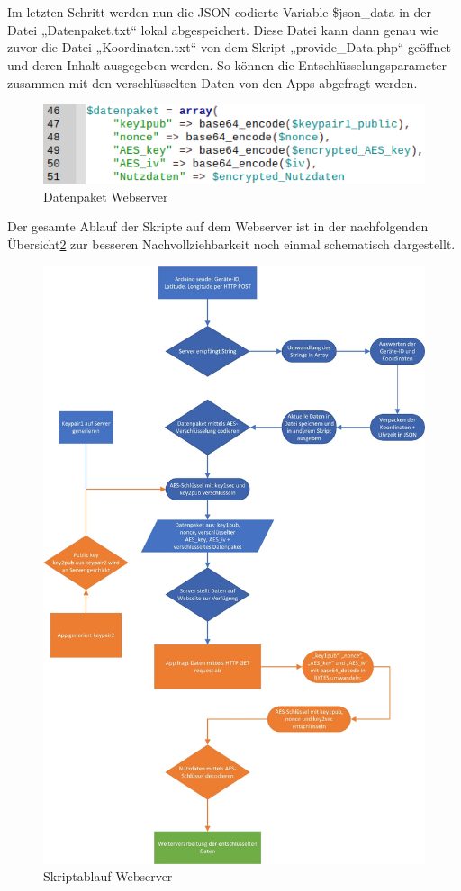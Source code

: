 \\
\\
Im letzten Schritt werden nun die JSON codierte Variable \$json\_data in der Datei „Datenpaket.txt“ lokal abgespeichert. Diese Datei kann dann genau wie zuvor die Datei „Koordinaten.txt“ von dem Skript „provide\_Data.php“ geöffnet und deren Inhalt ausgegeben werden. So können die Entschlüsselungsparameter zusammen mit den verschlüsselten Daten von den Apps abgefragt werden.
\begin{figure} [H]
	\begin{center}
		\includegraphics[width=1\textwidth]{Bilder/Webserver_verschluesslung.png}
		\caption{Datenpaket Webserver}
		\label{server-dp}
	\end{center}
\end{figure}
Der gesamte Ablauf der Skripte auf dem Webserver ist in der nachfolgenden Übersicht\ref{server-script} zur besseren Nachvollziehbarkeit noch einmal schematisch dargestellt.
\begin{figure} [H]
	\begin{center}
		\includegraphics[width=1\textwidth]{Bilder/Webserver_pap2.jpg}
		\caption{Skriptablauf Webserver}
		\label{server-script}
	\end{center}
\end{figure}

